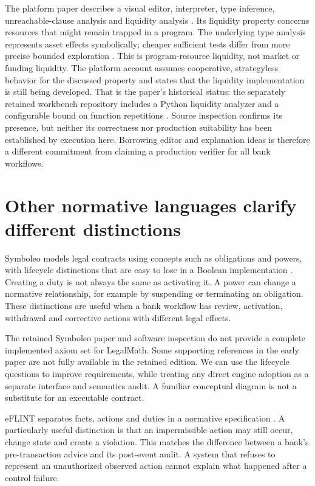 The platform paper describes a visual editor, interpreter, type inference,
unreachable-clause analysis and liquidity analysis
\citep[secs.~3--7]{stipulaplatform2026}. Its liquidity property concerns resources
that might remain trapped in a program. The underlying type analysis represents
asset effects symbolically; cheaper sufficient tests differ from more precise
bounded exploration \citep[secs.~4--5 and proof appendices]{liquidity2023}.
This is program-resource liquidity, not market or funding liquidity. The platform
account assumes cooperative, strategyless behavior for the discussed property
and states that the liquidity implementation is still being developed.
That is the paper's historical status: the separately retained workbench
repository includes a Python liquidity analyzer and a configurable bound
on function repetitions \citep{stipulacode}. Source inspection confirms
its presence, but neither its correctness nor production suitability has
been established by execution here. Borrowing
editor and explanation ideas is therefore a different commitment from claiming
a production verifier for all bank workflows.

\section{Other normative languages clarify different distinctions}
\label{merge:M04:08}

\label{sec:languages-other}
Symboleo models legal contracts using concepts such as obligations and powers,
with lifecycle distinctions that are easy to lose in a Boolean implementation
\citep[secs.~II--IV]{symboleo2020}. Creating a duty is not always the same as
activating it. A power can change a normative relationship, for example by
suspending or terminating an obligation. These distinctions are useful when a
bank workflow has review, activation, withdrawal and corrective actions with
different legal effects.

The retained Symboleo paper and software inspection do not provide a complete
implemented axiom set for LegalMath. Some supporting references in the early
paper are not fully available in the retained edition. We can use the lifecycle
questions to improve requirements, while treating any direct engine adoption
as a separate interface and semantics audit. A familiar conceptual diagram is
not a substitute for an executable contract.

eFLINT separates facts, actions and duties in a normative specification
\citep[secs.~3--5]{eflint2020}. A particularly useful distinction is that an
impermissible action may still occur, change state and create a violation.
This matches the difference between a bank's pre-transaction advice and its
post-event audit. A system that refuses to represent an unauthorized observed
action cannot explain what happened after a control failure.

